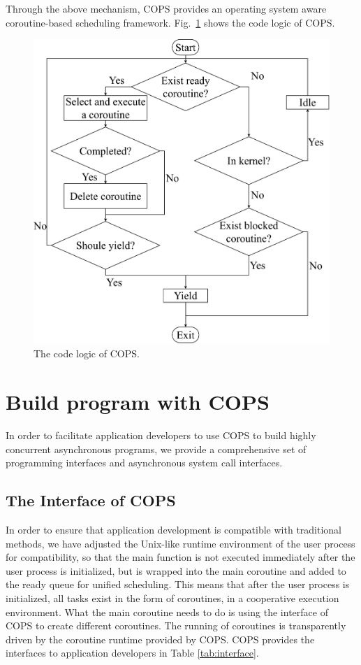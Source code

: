 \documentclass[sigconf,review,anonymous]{acmart}
\begin{document}
Through the above mechanism, COPS provides an operating system aware coroutine-based scheduling framework. Fig.~\ref{fig:flow} shows the code logic of COPS.

\begin{figure}[h]
  \centering
  \includegraphics[width=\linewidth]{assets/flow.pdf}
  \caption{The code logic of COPS.}
  \label{fig:flow}
\end{figure}

\section{Build program with {COPS}}

In order to facilitate application developers to use COPS to build highly concurrent asynchronous programs, we provide a comprehensive set of programming interfaces and asynchronous system call interfaces.

\subsection{The Interface of COPS}

In order to ensure that application development is compatible with traditional methods, we have adjusted the Unix-like runtime environment of the user process for compatibility, so that the main function is not executed immediately after the user process is initialized, but is wrapped into the main coroutine and added to the ready queue for unified scheduling. This means that after the user process is initialized, all tasks exist in the form of coroutines, in a cooperative execution environment. What the main coroutine needs to do is using the interface of COPS to create different coroutines. The running of coroutines is transparently driven by the coroutine runtime provided by COPS. COPS provides the interfaces to application developers in Table \ref{tab:interface}.
\end{document}
